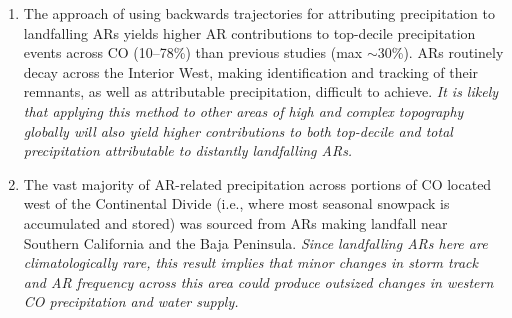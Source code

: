 \documentclass[draft]{agujournal2019}
\begin{document}
\begin{enumerate}
  \item The approach of using backwards trajectories for attributing precipitation to landfalling ARs yields higher AR contributions to top-decile precipitation events across CO (10--78\%) than previous studies (max $\sim$30\%). ARs routinely decay across the Interior West, making identification and tracking of their remnants, as well as attributable precipitation, difficult to achieve. \textit{It is likely that applying this method to other areas of high and complex topography globally will also yield higher contributions to both top-decile and total precipitation attributable to distantly landfalling ARs.}
  
  \item The vast majority of AR-related precipitation across portions of CO located west of the Continental Divide (i.e., where most seasonal snowpack is accumulated and stored) was sourced from ARs making landfall near Southern California and the Baja Peninsula. \textit{Since landfalling ARs here are climatologically rare, this result implies that minor changes in storm track and AR frequency across this area could produce outsized changes in western CO precipitation and water supply.}
  
\end{enumerate}
\end{document}
